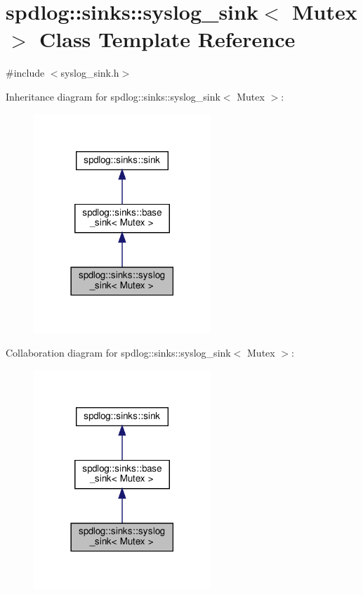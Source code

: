 \hypertarget{classspdlog_1_1sinks_1_1syslog__sink}{}\section{spdlog\+:\+:sinks\+:\+:syslog\+\_\+sink$<$ Mutex $>$ Class Template Reference}
\label{classspdlog_1_1sinks_1_1syslog__sink}


{\ttfamily \#include $<$syslog\+\_\+sink.\+h$>$}



Inheritance diagram for spdlog\+:\+:sinks\+:\+:syslog\+\_\+sink$<$ Mutex $>$\+:
\nopagebreak
\begin{figure}[H]
\begin{center}
\leavevmode
\includegraphics[width=189pt]{classspdlog_1_1sinks_1_1syslog__sink__inherit__graph}
\end{center}
\end{figure}


Collaboration diagram for spdlog\+:\+:sinks\+:\+:syslog\+\_\+sink$<$ Mutex $>$\+:
\nopagebreak
\begin{figure}[H]
\begin{center}
\leavevmode
\includegraphics[width=189pt]{classspdlog_1_1sinks_1_1syslog__sink__coll__graph}
\end{center}
\end{figure}
